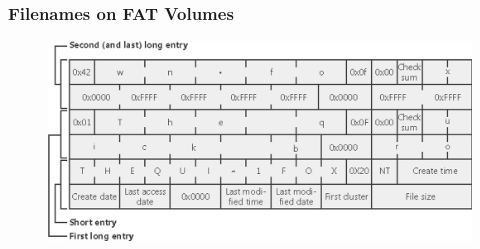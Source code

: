 % 
% 
\begin{frame}[fragile]
    \frametitle{Filenames on FAT Volumes}
    \begin{figure}
  \includegraphics[width=0.8\linewidth]{figs/FAT-filename.png}
  \end{figure}
\end{frame}
% 

